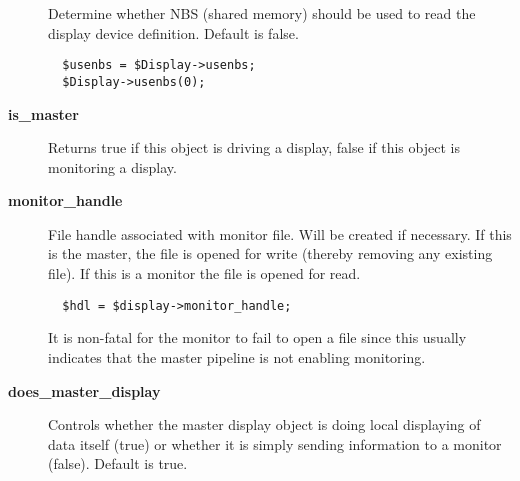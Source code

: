 \begin{description}
Determine whether NBS (shared memory) should be used to read the
display device definition. Default is false.

\begin{verbatim}
  $usenbs = $Display->usenbs;
  $Display->usenbs(0);
\end{verbatim}

\item[{\textbf{is\_master}}] \mbox{}

Returns true if this object is driving a display, false if this object is monitoring
a display.


\item[{\textbf{monitor\_handle}}] \mbox{}

File handle associated with monitor file. Will be created if
necessary.  If this is the master, the file is opened for write
(thereby removing any existing file). If this is a monitor the file is
opened for read.

\begin{verbatim}
  $hdl = $display->monitor_handle;
\end{verbatim}


It is non-fatal for the monitor to fail to open a file since this usually
indicates that the master pipeline is not enabling monitoring.


\item[{\textbf{does\_master\_display}}] \mbox{}

Controls whether the master display object is doing local displaying of data
itself (true) or whether it is simply sending information to a monitor (false).
Default is true.

\end{description}
